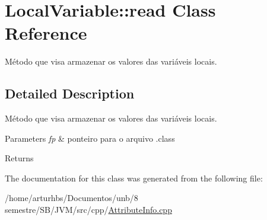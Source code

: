 \hypertarget{classLocalVariable_1_1read}{}\section{Local\+Variable\+:\+:read Class Reference}
\label{classLocalVariable_1_1read}


Método que visa armazenar os valores das variáveis locais.  




\subsection{Detailed Description}
Método que visa armazenar os valores das variáveis locais. 


\begin{DoxyParams}{Parameters}
{\em fp} & ponteiro para o arquivo .class \\
\hline
\end{DoxyParams}
\begin{DoxyReturn}{Returns}

\end{DoxyReturn}


The documentation for this class was generated from the following file\+:\begin{DoxyCompactItemize}
\item 
/home/arturhbs/\+Documentos/unb/8 semestre/\+S\+B/\+J\+V\+M/src/cpp/\hyperlink{AttributeInfo_8cpp}{Attribute\+Info.\+cpp}\end{DoxyCompactItemize}
